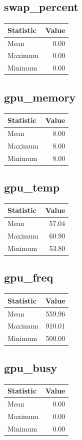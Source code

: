 \documentclass[11pt]{article}
\begin{document}
\subsection{swap_percent}
\begin{tabular}{lr}
\toprule
Statistic & Value \\
\midrule
Mean & 0.00 \\
Maximum & 0.00 \\
Minimum & 0.00 \\
\bottomrule
\end{tabular}


\subsection{gpu_memory}
\begin{tabular}{lr}
\toprule
Statistic & Value \\
\midrule
Mean & 8.00 \\
Maximum & 8.00 \\
Minimum & 8.00 \\
\bottomrule
\end{tabular}


\subsection{gpu_temp}
\begin{tabular}{lr}
\toprule
Statistic & Value \\
\midrule
Mean & 57.04 \\
Maximum & 60.90 \\
Minimum & 53.80 \\
\bottomrule
\end{tabular}


\subsection{gpu_freq}
\begin{tabular}{lr}
\toprule
Statistic & Value \\
\midrule
Mean & 559.96 \\
Maximum & 910.01 \\
Minimum & 500.00 \\
\bottomrule
\end{tabular}


\subsection{gpu_busy}
\begin{tabular}{lr}
\toprule
Statistic & Value \\
\midrule
Mean & 0.00 \\
Maximum & 0.00 \\
Minimum & 0.00 \\
\bottomrule
\end{tabular}
\end{document}
